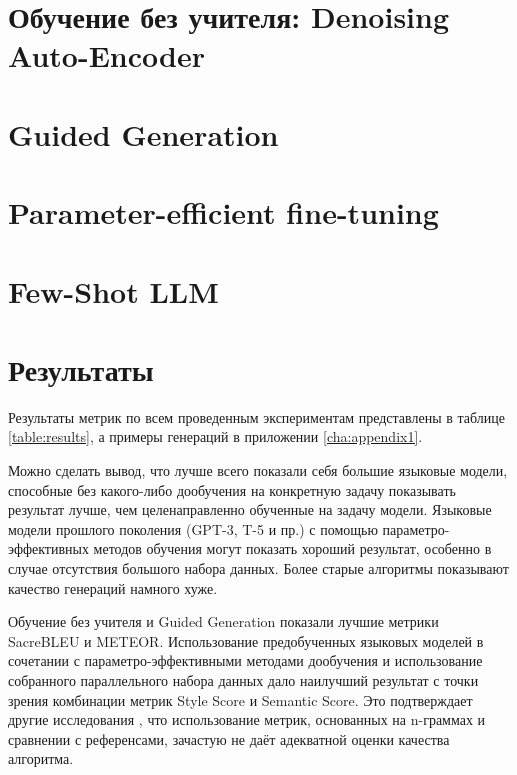 \section{Обучение без учителя: Denoising Auto-Encoder}


\section{Guided Generation}


\section{Parameter-efficient fine-tuning}


\section{Few-Shot LLM}


\section{Результаты}
Результаты метрик по всем проведенным экспериментам представлены в таблице \ref{table:results}, а примеры генераций в приложении \ref{cha:appendix1}.

Можно сделать вывод, что лучше всего показали себя большие языковые модели, способные без какого-либо дообучения на конкретную задачу показывать результат лучше, чем целенаправленно обученные на задачу модели.
Языковые модели прошлого поколения (GPT-3, T-5 и пр.) с помощью параметро-эффективных методов обучения могут показать хороший результат, особенно в случае отсутствия большого набора данных.
Более старые алгоритмы показывают качество генераций намного хуже.

Обучение без учителя и Guided Generation показали лучшие метрики SacreBLEU и METEOR.
Использование предобученных языковых моделей в сочетании с параметро-эффективными методами дообучения и использование собранного параллельного набора данных дало наилучший результат с точки зрения комбинации метрик Style Score и Semantic Score.
Это подтверждает другие исследования \cite{li2018delete, mir2019evaluating}, что использование метрик, основанных на n-граммах и сравнении с референсами, зачастую не даёт адекватной оценки качества алгоритма.


